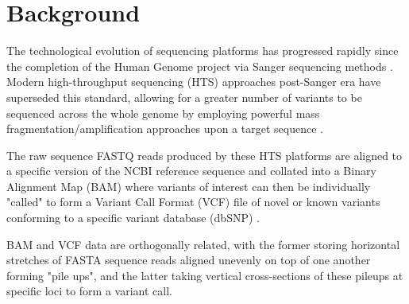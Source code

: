 \documentclass[twocolumn]{bmcart}%
\begin{document}


\section*{Background}
The technological evolution of sequencing platforms has progressed rapidly since the completion of the Human Genome project via Sanger sequencing methods \cite{lander2001initial,sanger1977dna}. Modern high-throughput sequencing (HTS) approaches post-Sanger era have superseded this standard, allowing for a greater number of variants to be sequenced across the whole genome by employing powerful mass fragmentation/amplification approaches upon a target sequence \cite{lengauer2007bioinformatics,bockenhauer2012genetic}.


The raw sequence FASTQ reads produced by these HTS platforms are aligned to a specific version of the NCBI reference sequence and collated into a Binary Alignment Map (BAM) where variants of interest can then be individually "called" to form a Variant Call Format (VCF) file of novel or known variants conforming to a specific variant database (dbSNP) \cite{li2009sequence,danecek2011variant}.

BAM and VCF data are orthogonally related, with the former storing horizontal stretches of FASTA sequence reads aligned unevenly on top of one another forming "pile ups", and the latter taking vertical cross-sections of these pileups at specific loci to form a variant call.
\end{document}
